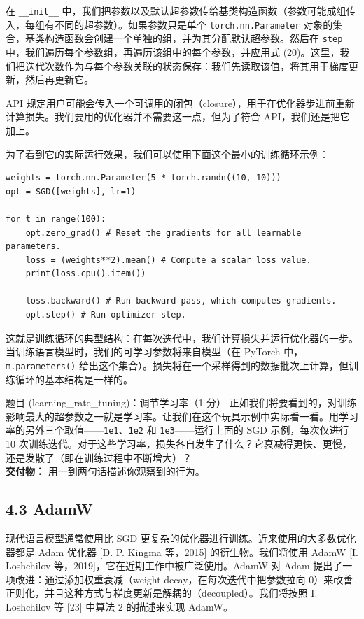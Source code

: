 在 \texttt{\_\_init\_\_} 中，我们把参数以及默认超参数传给基类构造函数（参数可能成组传入，每组有不同的超参数）。如果参数只是单个 \texttt{torch.nn.Parameter} 对象的集合，基类构造函数会创建一个单独的组，并为其分配默认超参数。然后在 \texttt{step} 中，我们遍历每个参数组，再遍历该组中的每个参数，并应用式 (20)。这里，我们把迭代次数作为与每个参数关联的状态保存：我们先读取该值，将其用于梯度更新，然后再更新它。

API 规定用户可能会传入一个可调用的闭包（closure），用于在优化器步进前重新计算损失。我们要用的优化器并不需要这一点，但为了符合 API，我们还是把它加上。

为了看到它的实际运行效果，我们可以使用下面这个最小的训练循环示例：

\begin{lstlisting}
weights = torch.nn.Parameter(5 * torch.randn((10, 10)))
opt = SGD([weights], lr=1)

for t in range(100):
    opt.zero_grad() # Reset the gradients for all learnable parameters.
    loss = (weights**2).mean() # Compute a scalar loss value.
    print(loss.cpu().item())

    loss.backward() # Run backward pass, which computes gradients.
    opt.step() # Run optimizer step.
\end{lstlisting}

这就是训练循环的典型结构：在每次迭代中，我们计算损失并运行优化器的一步。当训练语言模型时，我们的可学习参数将来自模型（在 PyTorch 中，\texttt{m.parameters()} 给出这个集合）。损失将在一个采样得到的数据批次上计算，但训练循环的基本结构是一样的。

\begin{problembox}{题目 (learning\_rate\_tuning)：调节学习率（1 分）}
正如我们将要看到的，对训练影响最大的超参数之一就是学习率。让我们在这个玩具示例中实际看一看。用学习率的另外三个取值——\texttt{1e1}、\texttt{1e2} 和 \texttt{1e3}——运行上面的 SGD 示例，每次仅进行 10 次训练迭代。对于这些学习率，损失各自发生了什么？它衰减得更快、更慢，还是发散了（即在训练过程中不断增大）？\\[2pt]
\textbf{交付物：} 用一到两句话描述你观察到的行为。
\end{problembox}

\subsection*{4.3 AdamW}

现代语言模型通常使用比 SGD 更复杂的优化器进行训练。近来使用的大多数优化器都是 Adam 优化器 [D. P. Kingma 等，2015] 的衍生物。我们将使用 AdamW [I. Loshchilov 等，2019]，它在近期工作中被广泛使用。AdamW 对 Adam 提出了一项改进：通过添加权重衰减（weight decay，在每次迭代中把参数拉向 0）来改善正则化，并且这种方式与梯度更新是解耦的（decoupled）。我们将按照 I. Loshchilov 等 [23] 中算法 2 的描述来实现 AdamW。

